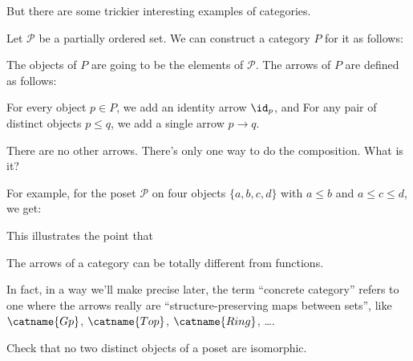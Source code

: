 But there are some trickier interesting examples of categories.
\begin{example}
	Let $\mathcal P$ be a partially ordered set.
	We can construct a category $P$ for it as follows:
	\begin{itemize}
		\ii The objects of $P$ are going to be the elements of $\mathcal P$.
		\ii The arrows of $P$ are defined as follows:
		\begin{itemize}
			\ii For every object $p \in P$, we add an identity arrow $\id_p$, and
			\ii For any pair of distinct objects $p \le q$, we add a single arrow $p \to q$.
		\end{itemize}
		There are no other arrows.
		\ii There's only one way to do the composition. What is it?
	\end{itemize}
\end{example}
For example, for the poset $\mathcal P$ on four objects $\{a,b,c,d\}$ with $a \le b$ and $a \le c \le d$, we get:
\begin{center}
\end{center}

This illustrates the point that
\begin{moral}
	The arrows of a category can be totally different from functions.
\end{moral}
In fact, in a way we'll make precise later, the term ``concrete category'' refers
to one where the arrows really are ``structure-preserving maps between sets'',
like $\catname{Gp}$, $\catname{Top}$, $\catname{Ring}$, \dots.

\begin{ques}
	Check that no two distinct objects of a poset are isomorphic.
\end{ques}

